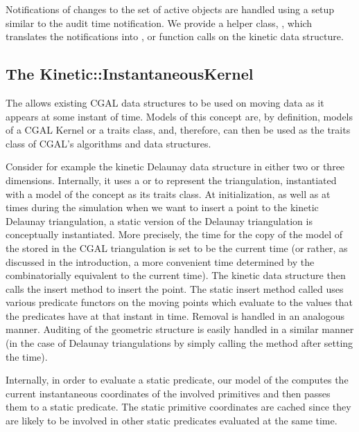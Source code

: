 Notifications of changes to the set of active objects are handled
using a setup similar to the  audit time
notification. We provide a helper class,
, which translates the notifications into ,
 or  function calls on the kinetic data
structure.



\subsection{The Kinetic::InstantaneousKernel}
\label{instantaneous_kernel}

The  allows existing CGAL data structures
to be used on moving data as it appears at some instant of time.
Models of this concept are, by definition, models of a CGAL
Kernel or a traits class, and, therefore, can then be used as
the traits class of CGAL's algorithms and data structures.

Consider for example the kinetic Delaunay data structure in either two
or three dimensions.  Internally, it uses a
 or
 to represent the
triangulation, instantiated with a model of the
 concept as its traits class.  At
initialization, as well as at times during the simulation when we want
to insert a point to the kinetic Delaunay triangulation, a static
version of the Delaunay triangulation is conceptually instantiated.
More precisely, the time for the copy of the model of the
 stored in the CGAL triangulation is set
to be the current time (or rather, as discussed in the introduction, a
more convenient time determined by the 
combinatorially equivalent to the current time).  The kinetic data
structure then calls the
 insert
method to insert the point.  The static insert method called uses
various predicate functors on the moving points which evaluate to the
values that the predicates have at that instant in time. Removal is
handled in an analogous manner. Auditing of the geometric structure is
easily handled in a similar manner (in the case of Delaunay
triangulations by simply calling the  method after
setting the time).

Internally, in order to evaluate a static predicate, our model of the
 computes the current instantaneous
coordinates of the involved primitives and then passes them to a
static predicate. The static primitive coordinates are cached since
they are likely to be involved in other static predicates evaluated at
the same time.


